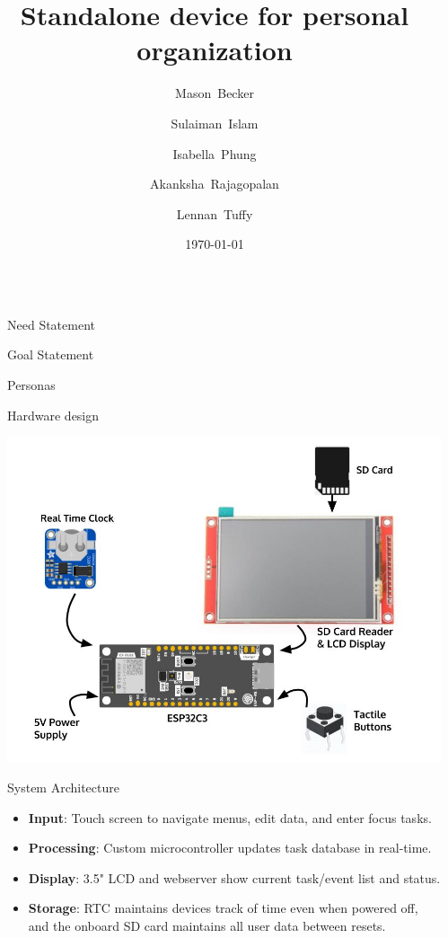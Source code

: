 \documentclass[final]{beamer}
\title{Standalone device for personal organization}
\author{
  Mason~Becker
  \and
  Sulaiman~Islam
  \and
  Isabella~Phung
  \and
  Akanksha~Rajagopalan
  \and
  Lennan~Tuffy
}
\institute[UC Santa Cruz]{CSE 123 - Supervised by Prof. David Harrison}
\date{\today}
\newlength{\sepwidth}
\newlength{\colwidth}
\newcommand{\separatorcolumn}{\begin{column}{\sepwidth}\end{column}}
\begin{document}
\begin{frame}[t]
\begin{columns}[t]
\separatorcolumn

\begin{column}{\colwidth}

  \begin{block}{Need Statement}
    
  \end{block}

  \begin{block}{Goal Statement}
    
  \end{block}

  \begin{block}{Personas} 
  
  \end{block}
    
   \begin{block}{Hardware design}
    \begin{center}
      \includegraphics{PrototypeDesign.jpg}
    \end{center}
  \end{block}

    \begin{block}{System Architecture} %
    
    \begin{itemize}
      \item \textbf{Input}: Touch screen to navigate menus, edit data, and enter focus tasks.
      \item \textbf{Processing}: Custom microcontroller updates task database in real-time.
      \item \textbf{Display}: 3.5" LCD and webserver show current task/event list and status.
      \item \textbf{Storage}: RTC maintains devices track of time even when powered off, and the onboard SD card maintains all user data between resets.
    \end{itemize}


\end{block}
\end{column}
\end{columns}
\end{frame}
\end{document}

